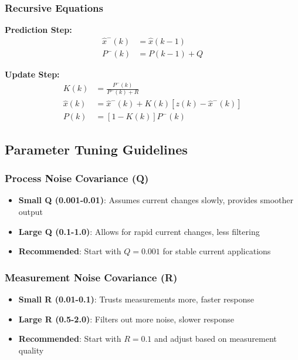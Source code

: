 \documentclass{article}
\begin{document}
\subsubsection{Recursive Equations}

\textbf{Prediction Step:}
\begin{align}
\hat{x}^{-}(k) &= \hat{x}(k-1) \\
P^{-}(k) &= P(k-1) + Q
\end{align}

\textbf{Update Step:}
\begin{align}
K(k) &= \frac{P^{-}(k)}{P^{-}(k) + R} \\
\hat{x}(k) &= \hat{x}^{-}(k) + K(k)[z(k) - \hat{x}^{-}(k)] \\
P(k) &= [1 - K(k)]P^{-}(k)
\end{align}

\subsection{Parameter Tuning Guidelines}

\subsubsection{Process Noise Covariance (Q)}
\begin{itemize}
    \item \textbf{Small Q (0.001-0.01)}: Assumes current changes slowly, provides smoother output
    \item \textbf{Large Q (0.1-1.0)}: Allows for rapid current changes, less filtering
    \item \textbf{Recommended}: Start with $Q = 0.001$ for stable current applications
\end{itemize}

\subsubsection{Measurement Noise Covariance (R)}
\begin{itemize}
    \item \textbf{Small R (0.01-0.1)}: Trusts measurements more, faster response
    \item \textbf{Large R (0.5-2.0)}: Filters out more noise, slower response
    \item \textbf{Recommended}: Start with $R = 0.1$ and adjust based on measurement quality
\end{itemize}
\end{document}

